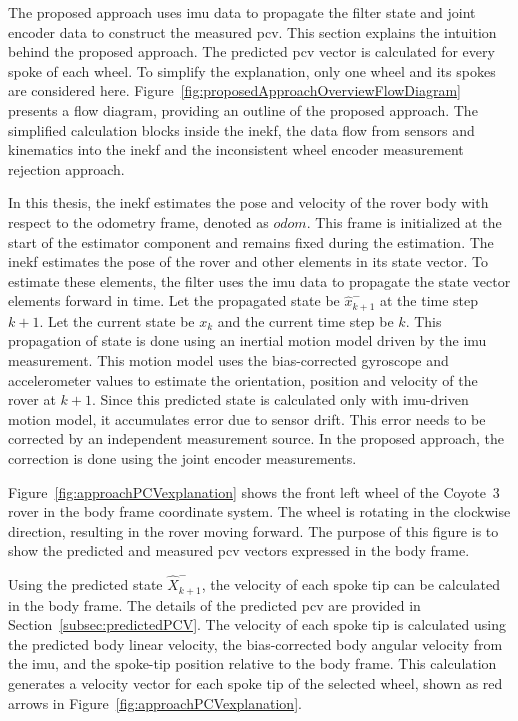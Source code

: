 \documentclass[report.tex]{subfiles}
\begin{document}
    The proposed approach uses \gls{imu} data to propagate the filter state and joint encoder data to construct the measured \gls{pcv}. This section explains the intuition behind the proposed approach. The predicted \gls{pcv} vector is calculated for every spoke of each wheel. To simplify the explanation, only one wheel and its spokes are considered here. Figure~\ref{fig:proposedApproachOverviewFlowDiagram} presents a flow diagram, providing an outline of the proposed approach. The simplified calculation blocks inside the \gls{inekf}, the data flow from sensors and kinematics into the \gls{inekf} and the inconsistent wheel encoder measurement rejection approach.
    
    In this thesis, the \gls{inekf} estimates the pose and velocity of the rover body with respect to the odometry frame, denoted as $odom$. This frame is initialized at the start of the estimator component and remains fixed during the estimation. The \gls{inekf} estimates the pose of the rover and other elements in its state vector. To estimate these elements, the filter uses the \gls{imu} data to propagate the state vector elements forward in time. Let the propagated state be $\hat{x}^{-}_{k+1}$ at the time step $k+1$. Let the current state be $x_{k}$ and the current time step be $k$. This propagation of state is done using an inertial motion model driven by the \gls{imu} measurement. This motion model uses the bias-corrected gyroscope and accelerometer values to estimate the orientation, position and velocity of the rover at $k+1$. Since this predicted state is calculated only with \gls{imu}-driven motion model, it accumulates error due to sensor drift. This error needs to be corrected by an independent measurement source. In the proposed approach, the correction is done using the joint encoder measurements.
    
    Figure~\ref{fig:approachPCVexplanation} shows the front left wheel of the Coyote~3 rover in the body frame coordinate system. The wheel is rotating in the clockwise direction, resulting in the rover moving forward. The purpose of this figure is to show the predicted and measured \gls{pcv} vectors expressed in the body frame. 
    
    Using the predicted state $\hat{X}^{-}_{k+1}$, the velocity of each spoke tip can be calculated in the body frame. The details of the predicted \gls{pcv} are provided in Section~\ref{subsec:predictedPCV}. The velocity of each spoke tip is calculated using the predicted body linear velocity, the bias-corrected body angular velocity from the \gls{imu}, and the spoke-tip position relative to the body frame. This calculation generates a velocity vector for each spoke tip of the selected wheel, shown as red arrows in Figure~\ref{fig:approachPCVexplanation}. 
    
\end{document}
